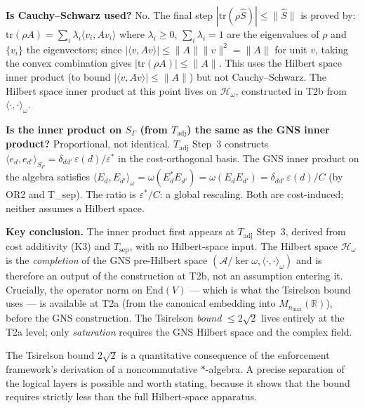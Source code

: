 \documentclass[11pt]{article}
\theoremstyle{remark}
\begin{document}
\medskip\noindent\textbf{Is Cauchy--Schwarz used?}  No.  The final step $|\mathrm{tr}(\rho\hat{S})| \le \|\hat{S}\|$ is proved by: $\mathrm{tr}(\rho A) = \sum_i \lambda_i \langle v_i, Av_i\rangle$ where $\lambda_i \ge 0$, $\sum_i \lambda_i = 1$ are the eigenvalues of $\rho$ and $\{v_i\}$ the eigenvectors; since $|\langle v, Av\rangle| \le \|A\|\|v\|^2 = \|A\|$ for unit $v$, taking the convex combination gives $|\mathrm{tr}(\rho A)| \le \|A\|$.  This uses the Hilbert space inner product (to bound $|\langle v, Av\rangle| \le \|A\|$) but not Cauchy--Schwarz.  The Hilbert space inner product at this point lives on $\mathcal{H}_\omega$, constructed in T2b from $\langle\cdot,\cdot\rangle_\omega$.

\medskip\noindent\textbf{Is the inner product on $S_\Gamma$ (from $T_{\mathrm{adj}}$) the same as the GNS inner product?}  Proportional, not identical.  $T_{\mathrm{adj}}$ Step~3 constructs $\langle e_d, e_{d'}\rangle_{S_\Gamma} = \delta_{dd'}\,\varepsilon(d)/\varepsilon^*$ in the cost-orthogonal basis.  The GNS inner product on the algebra satisfies $\langle E_d, E_{d'}\rangle_\omega = \omega(E_d^* E_{d'}) = \omega(E_d E_{d'}) = \delta_{dd'}\,\varepsilon(d)/C$ (by OR2 and T\_sep).  The ratio is $\varepsilon^*/C$: a global rescaling.  Both are cost-induced; neither assumes a Hilbert space.

\medskip\noindent\textbf{Key conclusion.}  The inner product first appears at $T_{\mathrm{adj}}$ Step~3, derived from cost additivity (K3) and $T_{\mathrm{sep}}$, with no Hilbert-space input.  The Hilbert space $\mathcal{H}_\omega$ is the \emph{completion} of the GNS pre-Hilbert space $(\mathcal{A}/\ker\omega, \langle\cdot,\cdot\rangle_\omega)$ and is therefore an output of the construction at T2b, not an assumption entering it.  Crucially, the operator norm on $\mathrm{End}(V)$ --- which is what the Tsirelson bound uses --- is available at T2a (from the canonical embedding into $M_{n_{\max}}(\mathbb{R})$), before the GNS construction.  The Tsirelson \emph{bound} $\le 2\sqrt{2}$ lives entirely at the T2a level; only \emph{saturation} requires the GNS Hilbert space and the complex field.



The Tsirelson bound $2\sqrt{2}$ is a quantitative consequence of the enforcement framework's derivation of a noncommutative $*$-algebra.  A precise separation of the logical layers is possible and worth stating, because it shows that the bound requires strictly less than the full Hilbert-space apparatus.
\end{document}

